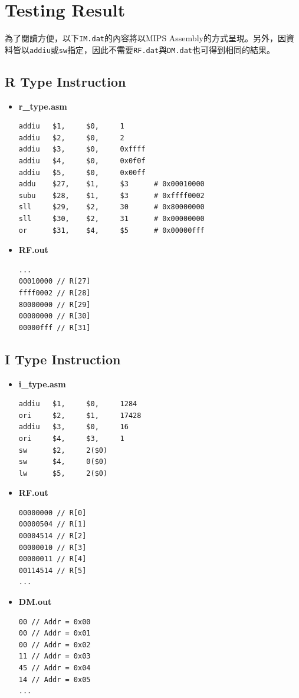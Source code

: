 \documentclass[12pt]{article}
\begin{document}
\section{Testing Result}

為了閱讀方便，以下\texttt{IM.dat}的內容將以MIPS Assembly的方式呈現。另外，因資料皆以\texttt{addiu}或\texttt{sw}指定，因此不需要\texttt{RF.dat}與\texttt{DM.dat}也可得到相同的結果。

\subsection{R Type Instruction}

\begin{itemize}
    \item \textbf{r\_type.asm}
    \begin{lstlisting}[language={[mips]Assembler}, frame=single]
addiu   $1,     $0,     1
addiu   $2,     $0,     2
addiu   $3,     $0,     0xffff
addiu   $4,     $0,     0x0f0f
addiu   $5,     $0,     0x00ff
addu    $27,    $1,     $3      # 0x00010000
subu    $28,    $1,     $3      # 0xffff0002
sll     $29,    $2,     30      # 0x80000000
sll     $30,    $2,     31      # 0x00000000
or      $31,    $4,     $5      # 0x00000fff
    \end{lstlisting}

    \item 
    \textbf{RF.out}
    \begin{lstlisting}[language={}]
...
00010000 // R[27]
ffff0002 // R[28]
80000000 // R[29]
00000000 // R[30]
00000fff // R[31]
    \end{lstlisting}
\end{itemize}

\subsection{I Type Instruction}
\begin{itemize}
    \item \textbf{i\_type.asm}
    \begin{lstlisting}[language={[mips]Assembler}, frame=single]
addiu   $1,     $0,     1284
ori     $2,     $1,     17428
addiu   $3,     $0,     16
ori     $4,     $3,     1
sw      $2,     2($0)
sw      $4,     0($0)
lw      $5,     2($0)
    \end{lstlisting}

    \item \textbf{RF.out}
    \begin{lstlisting}[language={}]
00000000 // R[0]
00000504 // R[1]
00004514 // R[2]
00000010 // R[3]
00000011 // R[4]
00114514 // R[5]
...
    \end{lstlisting}

    \item \textbf{DM.out}
    \begin{lstlisting}[language={}]
00 // Addr = 0x00
00 // Addr = 0x01
00 // Addr = 0x02
11 // Addr = 0x03
45 // Addr = 0x04
14 // Addr = 0x05
...
    \end{lstlisting}
\end{itemize}
\end{document}
